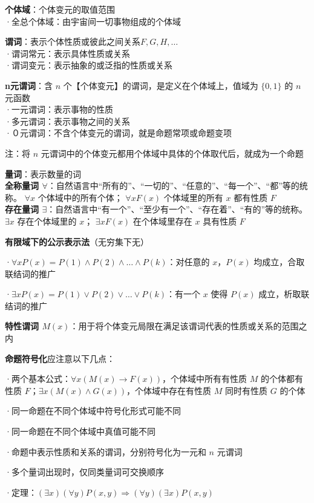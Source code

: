 \textbf{个体域}：个体变元的取值范围\\
·全总个体域：由宇宙间一切事物组成的个体域

\textbf{谓词}：表示个体性质或彼此之间关系$F, G, H, \ldots$\\
·谓词常元：表示具体性质或关系\\
·谓词变元：表示抽象的或泛指的性质或关系

\textbf{n元谓词}：含 $n$ 个【个体变元】的谓词，是定义在个体域上，值域为 $\{0,1\}$ 的 $n$ 元函数\\
·一元谓词：表示事物的性质\\
·多元谓词：表示事物之间的关系\\
·０元谓词：不含个体变元的谓词，就是命题常项或命题变项

注：将 $n$ 元谓词中的个体变元都用个体域中具体的个体取代后，就成为一个命题

\textbf{量词}：表示数量的词\\
\textbf{全称量词 $\forall$}：自然语言中“所有的”、“一切的”、“任意的”、“每一个”、“都”等的统称。 $\forall x$ 个体域中的所有个体； $\forall x F(x)$ 个体域里的所有 $x$ 都有性质 $F$\\
\textbf{存在量词 $\exists$}：自然语言中“有一个”、“至少有一个”、“存在着”、“有的”等的统称。 $\exists x$ 存在个体域里的 $x$； $\exists x F(x)$ 在个体域里存在 $x$ 具有性质 $F$

\textbf{有限域下的公示表示法}（无穷集下无）

·$\forall x P(x) = P(1) \land P(2) \land \ldots \land P(k)$：对任意的 $x$，$P(x)$ 均成立，合取联结词的推广

·$\exists x P(x) = P(1) \lor P(2) \lor \ldots \lor P(k)$：有一个 $x$ 使得 $P(x)$ 成立，析取联结词的推广

\textbf{特性谓词 $M(x)$}：用于将个体变元局限在满足该谓词代表的性质或关系的范围之内

\textbf{命题符号化}应注意以下几点：

·两个基本公式：$\forall x (M(x) \rightarrow F(x))$，个体域中所有有性质 $M$ 的个体都有性质 $F$；$\exists x (M(x) \land G(x))$，个体域中存在有性质 $M$ 同时有性质 $G$ 的个体

·同一命题在不同个体域中符号化形式可能不同

·同一命题在不同个体域中真值可能不同

·命题中表示性质和关系的谓词，分别符号化为一元和 $n$ 元谓词

·多个量词出现时，仅同类量词可交换顺序

·定理：$(\exists x)(\forall y) P(x,y) \Rightarrow (\forall y)(\exists x) P(x,y)$


